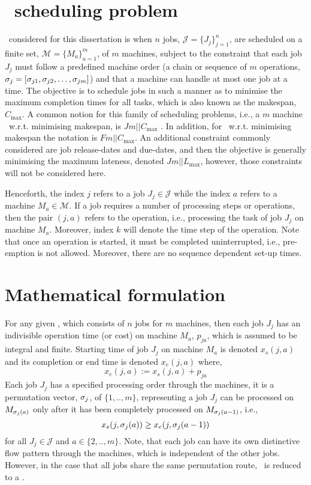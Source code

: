 \section{\Jsp\ scheduling problem}
\Jsp\ considered for this dissertation is when $n$ jobs, 
$\mathcal{J}=\{J_j\}_{j=1}^n$, are scheduled on a finite set, 
$\mathcal{M}=\{M_a\}_{a=1}^m$, of $m$ machines, subject to the constraint that 
each job $J_j$ must follow a predefined machine order (a chain or sequence of 
$m$ operations, ${\mathbf{\sigma}}_j=[\sigma_{j1},\sigma_{j2},\dotsc,\sigma_{jm}]$) and 
that a machine can handle at most one job at a time. 
The objective is to schedule jobs in such a manner as to minimise the maximum completion times for all tasks, which is also known as the makespan, $C_{\max}$. A common notion for this family of scheduling problems, i.e., a $m$ machine \JSP\ w.r.t. minimising makespan, is $Jm||C_{\max}$ \citep[cf.][]{Pinedo08}. In addition, for \FSP\ w.r.t. minimising makespan the notation is $Fm||C_{\max}$. 
An additional constraint commonly considered are job release-dates and due-dates, and then the objective is generally minimising the maximum lateness, denoted $Jm||L_{\max}$, however, those  constraints will not be considered here. 

Henceforth, the index $j$ refers to a job $J_j\in\mathcal{J}$ while the index 
$a$ refers to a machine $M_a\in\mathcal{M}$. If a job requires a number of 
processing steps or operations, then the pair $(j,a)$ refers to the operation, 
i.e., processing the task of job $J_j$ on machine $M_a$. Moreover, index $k$ 
will denote the time step of the operation. Note that once an operation is 
started, it must be completed uninterrupted, i.e., pre-emption is not allowed. 
Moreover, there are no sequence dependent set-up times.

\section{Mathematical formulation}
For any given \JSP, which consists of $n$ jobs for $m$ machines, then each job $J_j$ has an indivisible operation time (or cost) on machine $M_a$, $p_{ja}$, which is assumed to be integral and finite. 
Starting time of job $J_j$ on machine $M_a$ is denoted $x_s(j,a)$ and its 
completion or end time is denoted $x_e(j,a)$ where, 
\begin{equation}  x_e(j,a):=x_s(j,a)+p_{ja} \end{equation} 
Each job $J_j$ has a specified processing order through the machines, it is a permutation vector, ${\mathbf{\sigma}}_j$, of $\{1,..,m\}$, representing a job $J_j$ can be processed on $M_{{\mathbf{\sigma}}_j(a)}$ only after it has been completely processed on $M_{{\mathbf{\sigma}}_j(a-1)}$, i.e.,
\begin{equation}\label{eq:permutation}
	x_s(j,\vsigma_j(a)) \geq x_e(j,\vsigma_j(a-1)) 
\end{equation}
for all $J_j\in\mathcal{J}$ and $a\in\{2,..,m\}$. 
Note, that each job can have its own distinctive flow pattern through the 
machines, which is independent of the other jobs. However, in the case that all 
jobs share the same permutation route, \JSP\ is reduced to a \FSP.

